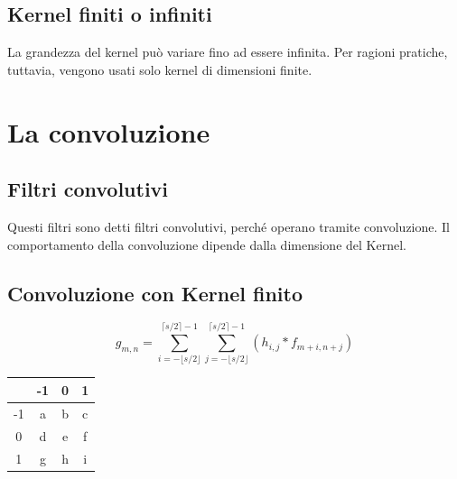 \documentclass{report}
\begin{document}
	\subsection{Kernel finiti o infiniti}
	La grandezza del kernel può variare fino ad essere infinita.
	Per ragioni pratiche, tuttavia, vengono usati solo kernel di dimensioni finite.
	\newpage
	\section{La convoluzione}
	\subsection{Filtri convolutivi}
	Questi filtri sono detti filtri convolutivi, perché operano tramite convoluzione. Il comportamento della convoluzione dipende dalla dimensione del Kernel.
	\subsection{Convoluzione con Kernel finito}
	$$
	g_{m,n} = \sum^{\lceil s/2 \rceil-1}_{i=- \lfloor s/2 \rfloor}\sum^{\lceil s/2 \rceil-1}_{j=- \lfloor s/2 \rfloor} (h_{i,j}*f_{m+i, n+j})
	$$
	
	\begin{center}
		\begin{tabular}{| c | | c | c | c |} 
			    
			\hline
			   & -1 & 0 & 1 \\
			\hline 
			\hline
			-1 & a  & b & c \\
			\hline
			0  & d  & e & f \\
			\hline
			1  & g  & h & i \\
			\hline
		\end{tabular}
	\end{center}
	
\end{document}
